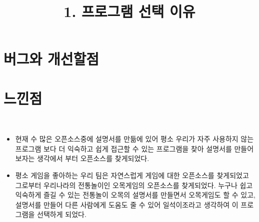 \documentclass[a4paper, 11pt]{article}
\begin{document}
	
	
	
	\vspace{1cm}
	\section{버그와 개선할점}
	
	\vspace{1cm}
	\section{느낀점}
	
	
   \newpage
	\title{\textbf{\Huge1. 프로그램 선택 이유}}\\
	
	{\Large
		\begin{itemize}
			\item 현재 수 많은 오픈소스중에 설명서를 만듦에 있어 평소 우리가 자주 사용하지 않는 프로그램 보다 더 익숙하고 쉽게 접근할 수 있는 프로그램을 찾아 설명서를 만들어 보자는 생각에서 부터 오픈소스를 찾게되었다.
			\item 평소 게임을 좋아하는 우리 팀은 자연스럽게 게임에 대한 오픈소스를 찾게되었고 그로부터 우리나라의 전통놀이인 오목게임의 오픈소스를 찾게되었다. 누구나 쉽고 익숙하게 즐길 수 있는 전통놀이 오목의 설명서를 만들면서 오목게임도 할 수 있고,설명서를 만들어 다른 사람에게 도움도 줄 수 있어 일석이조라고 생각하여  이 프로그램을 선택하게 되었다.
		\end{itemize}
	
	}
\end{document}
